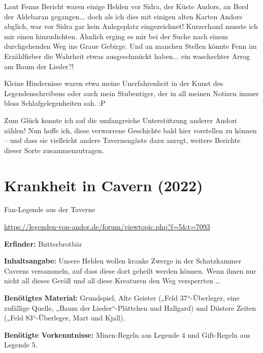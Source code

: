 {

Laut Fenns Bericht waren einige Helden vor Sidra, der Küste Andors, an Bord der Aldebaran gegangen... doch als ich dies mit einigen alten Karten Andors abglich, war vor Sidra gar kein Anlegeplatz eingezeichnet! Kurzerhand musste ich mir einen hinzudichten. Ähnlich erging es mir bei der Suche nach einem durchgehenden Weg ins Graue Gebirge. Und an manchen Stellen könnte Fenn im Erzählfieber die Wahrheit etwas ausgeschmückt haben... ein waschechter Arrog am Baum der Lieder?!

Kleine Hindernisse waren etwa meine Unerfahrenheit in der Kunst des Legendenschreibens oder auch mein Stubentiger, der in all meinen Notizen immer bloss Schlafgelegenheiten sah. :P


Zum Glück konnte ich auf die umfangreiche Unterstützung anderer Andori zählen!
Nun hoffe ich, diese verworrene Geschichte bald hier vorstellen zu können – und dass sie vielleicht andere Tavernengäste dazu anregt, weitere Berichte dieser Sorte zusammenzutragen.




\newpage
{}
\section{Krankheit in Cavern (2022)}

\begin{center}
    Fan-Legende aus der Taverne

    \url{https://legenden-von-andor.de/forum/viewtopic.php?f=5&t=7093}
\end{center}



\textbf{Erfinder:} Butterbrotbär

\textbf{Inhaltsangabe:} Unsere Helden wollen kranke Zwerge in der Schatzkammer Caverns versammeln, auf dass diese dort geheilt werden können. Wenn ihnen nur nicht all dieses Geröll und all diese Kreaturen den Weg versperrten …

\textbf{Benötigtes Material:} Grundspiel, Alte Geister („Feld 37“-Überleger, eine zufällige Quelle, „Baum der Lieder“-Plättchen und Hallgard) und Düstere Zeiten („Feld 83“-Überleger, Mart und Kjall).

\textbf{Benötigte Vorkenntnisse:} Minen-Regeln aus Legende 4 und Gift-Regeln aus Legende 5.

}
